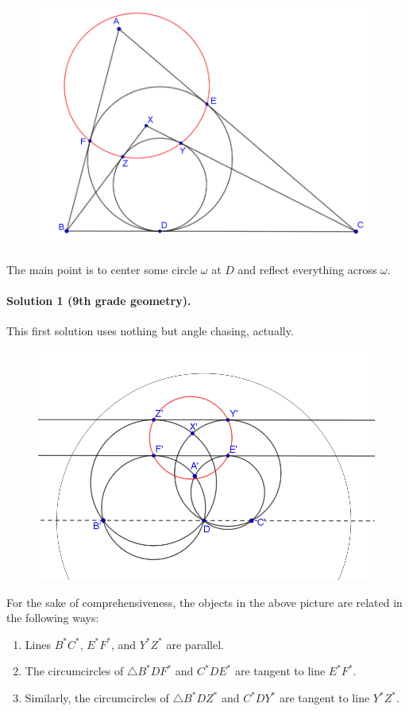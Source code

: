 \documentclass{scrartcl}
\providecommand{\ii}{\item}
\begin{document}
\begin{figure}[h]
	\centering
	\includegraphics[width=0.7\linewidth]{inversion_twoIncircles}
	\label{fig:inversiontwoincircles}
\end{figure}

The main point is to center some circle $\omega$ at $D$
and reflect everything across $\omega$.

\paragraph{Solution 1 (9th grade geometry).}
This first solution uses nothing but angle chasing, actually.

\begin{figure}[h]
	\centering
	\includegraphics[width=0.7\linewidth]{inversion_twoIncircles_solution1}
	\label{fig:inversiontwoincirclessolution1}
\end{figure}

For the sake of comprehensiveness, the objects in the above picture
are related in the following ways:
\begin{enumerate}
	\ii Lines $B^\ast C^\ast$, $E^\ast F^\ast$, and $Y^\ast Z^\ast$ are parallel.
	\ii The circumcircles of $\triangle B^\ast DF^\ast$ and
	$C^\ast DE^\ast$ are tangent to line $E^\ast F^\ast$.
	\ii Similarly, the circumcircles of $\triangle B^\ast DZ^\ast$ and
	$C^\ast DY^\ast$ are tangent to line $Y^\ast Z^\ast$.
\end{enumerate}
\end{document}

